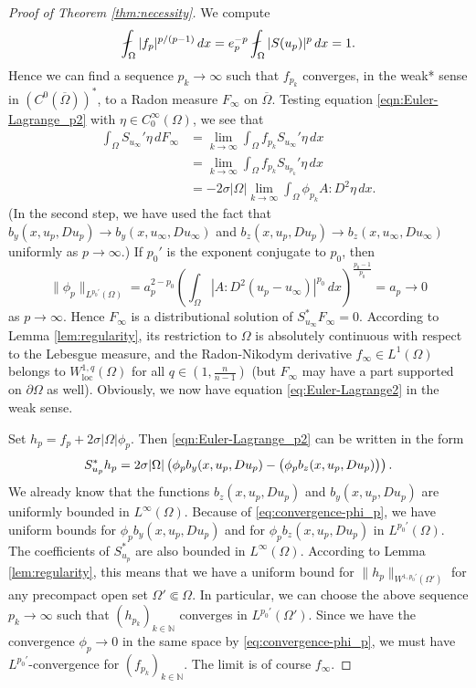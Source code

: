 \documentclass[a4paper]{article}
\newcommand{\N}{\mathbb{N}}
\newcommand{\loc}{\mathrm{loc}}
\let\div\relax\DeclareMathOperator{\div}{div}
\theoremstyle{remark}
\begin{document}
\begin{proof}[Proof of Theorem \ref{thm:necessity}]
We compute
\begin{equation} \label{eqn:L^{p'}-estimate}
\fint_\Omega |f_p|^{p/(p - 1)} \, dx = e_p^{-p} \fint_\Omega |S(u_p)|^p \, dx = 1.
\end{equation}
Hence we can find a sequence $p_k \to \infty$ such that $f_{p_k}$ converges, in the weak* sense in $(C^0(\overline{\Omega}))^*$, to a Radon measure $F_\infty$ on $\overline{\Omega}$. Testing equation \eqref{eqn:Euler-Lagrange_p2} with $\eta \in C_0^\infty(\Omega)$, we see that
\[
\begin{split}
\int_\Omega S_{u_\infty}' \eta \, dF_\infty & = \lim_{k \to \infty} \int_\Omega f_{p_k} S_{u_\infty}' \eta \, dx \\
& = \lim_{k \to \infty} \int_\Omega f_{p_k} S_{u_{p_k}}' \eta \, dx \\
& = - 2\sigma |\Omega| \lim_{k \to \infty} \int_\Omega \phi_{p_k} A : D^2 \eta \, dx.
\end{split}
\]
(In the second step, we have used the fact that $b_y(x, u_p, Du_p) \to b_y(x, u_\infty, Du_\infty)$ and $b_z(x, u_p, Du_p) \to b_z(x, u_\infty, Du_\infty)$
uniformly as $p \to \infty$.)
If $p_0'$ is the exponent conjugate to $p_0$, then
\begin{equation} \label{eq:convergence-phi_p}
\|\phi_p\|_{L^{p_0'}(\Omega)} = a_p^{2 - p_0} \left(\int_\Omega |A : D^2(u_p - u_\infty)|^{p_0} \, dx\right)^{\frac{p_0 - 1}{p_0}} = a_p \to 0
\end{equation}
as $p \to \infty$. Hence $F_\infty$ is a distributional solution of
$S_{u_\infty}^* F_\infty = 0$. According to Lemma \ref{lem:regularity},
its restriction to $\Omega$ is absolutely continuous with respect to the Lebesgue measure, and the Radon-Nikodym derivative
$f_\infty \in L^1(\Omega)$ belongs to $W_\loc^{1, q}(\Omega)$ for all $q \in (1, \frac{n}{n - 1})$ (but $F_\infty$ may have a part supported on $\partial \Omega$ as well). Obviously, we now have equation \eqref{eq:Euler-Lagrange2}
in the weak sense.

Set $h_p = f_p + 2\sigma |\Omega| \phi_p$. Then \eqref{eqn:Euler-Lagrange_p2}
can be written in the form
\[
S_{u_p}^* h_p = 2\sigma |\Omega| \left(\phi_p b_y(x, u_p, Du_p) - \div \bigl(\phi_p b_z(x, u_p, Du_p)\bigr)\right).
\]
We already know that
the functions $b_z(x, u_p, Du_p)$ and $b_y(x, u_p, Du_p)$ are uniformly
bounded in $L^\infty(\Omega)$. Because of \eqref{eq:convergence-phi_p},
we have uniform bounds for $\phi_p b_y(x, u_p, Du_p)$ and for $\phi_p b_z(x, u_p, Du_p)$ in $L^{p_0'}(\Omega)$. The coefficients of $S_{u_p}^*$ are also bounded in
$L^\infty(\Omega)$.
According to Lemma \ref{lem:regularity}, this means that we have a uniform bound
for $\|h_p\|_{W^{1, p_0'}(\Omega')}$ for any precompact open set
$\Omega' \Subset \Omega$. In particular, we can choose the above
sequence $p_k \to \infty$ such that $(h_{p_k})_{k \in \N}$
converges in $L^{p_0'}(\Omega')$. Since we have the convergence $\phi_p \to 0$
in the same space by
\eqref{eq:convergence-phi_p}, we must have $L^{p_0'}$-convergence
for $(f_{p_k})_{k \in \N}$. The limit is of course $f_\infty$.


\end{proof}
\end{document}
